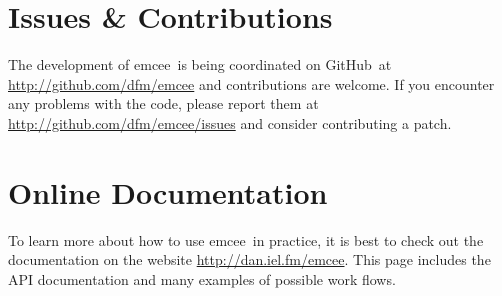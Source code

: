 \documentclass[12pt,preprint]{aastex}
\newcommand{\project}[1]{{\sffamily #1}}
\newcommand{\github}{\project{GitHub}}
\newcommand{\thisplain}{emcee}
\newcommand{\this}{\project{\thisplain}}
\begin{document}
\section{Issues \& Contributions}

The development of \this\ is being coordinated on \github\ at
\url{http://github.com/dfm/emcee} and contributions are welcome. If you
encounter any problems with the code, please report them at
\url{http://github.com/dfm/emcee/issues} and consider
contributing a patch.

\section{Online Documentation}

To learn more about how to use \this\ in practice, it is best to check out the
documentation on the website \url{http://dan.iel.fm/emcee}. This page includes
the API documentation and many examples of possible work flows.
\end{document}
